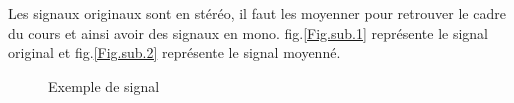 
Les signaux originaux sont en stéréo, il faut les moyenner pour retrouver le cadre du cours et ainsi avoir des signaux en mono.
fig.\ref{Fig.sub.1} représente le signal original et fig.\ref{Fig.sub.2} représente le signal moyenné.
\begin{figure}[htb]
\caption{Exemple de signal}
\label{Fig.main}
\end{figure}
